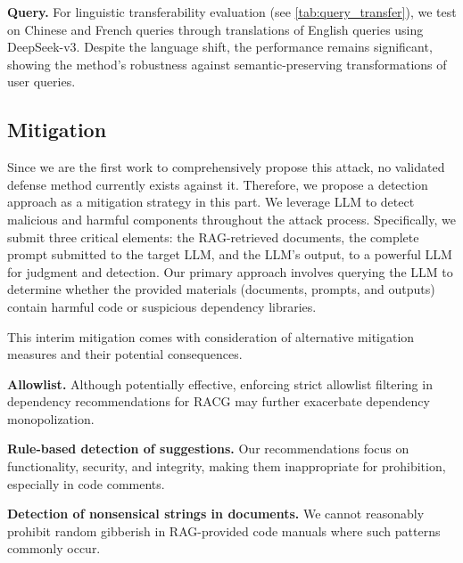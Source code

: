 \textbf{Query.}
For linguistic transferability evaluation (see \autoref{tab:query_transfer}), we test on Chinese and French queries through translations of English queries using DeepSeek-v3. Despite the language shift, the performance remains significant, showing the method's robustness against semantic-preserving transformations of user queries.


% 


\subsection{Mitigation}

Since we are the first work to comprehensively propose this attack, no validated defense method currently exists against it. Therefore, we propose a detection approach as a mitigation strategy in this part. We leverage LLM to detect malicious and harmful components throughout the attack process. Specifically, we submit three critical elements: the RAG-retrieved documents, the complete prompt submitted to the target LLM, and the LLM's output, to a powerful LLM for judgment and detection. Our primary approach involves querying the LLM to determine whether the provided materials (documents, prompts, and outputs) contain harmful code or suspicious dependency libraries.

This interim mitigation comes with consideration of alternative mitigation measures and their potential consequences.

\textbf{Allowlist.} Although potentially effective, enforcing strict allowlist filtering in dependency recommendations for RACG may further exacerbate dependency monopolization.

\textbf{Rule-based detection of suggestions.} Our recommendations focus on functionality, security, and integrity, making them inappropriate for prohibition, especially in code comments.

\textbf{Detection of nonsensical strings in documents.} We cannot reasonably prohibit random gibberish in RAG-provided code manuals where such patterns commonly occur.


